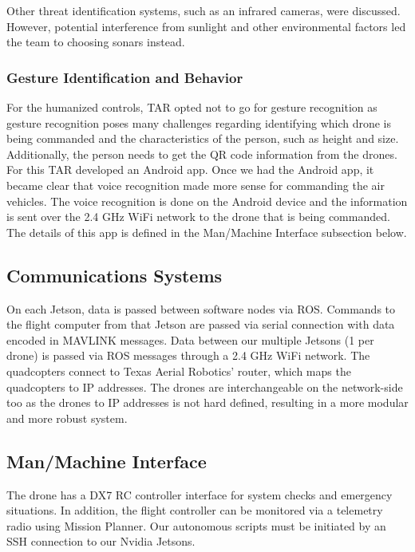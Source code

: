 \documentclass[12pt,letterpaper]{article}
\begin{document}
		Other threat identification systems, such as an infrared cameras, were discussed. However, potential interference from sunlight and other environmental factors led the team to choosing sonars instead.

		\subsubsection*{Gesture Identification and Behavior}
		For the humanized controls, TAR opted not to go for gesture recognition as gesture recognition poses many challenges regarding identifying which drone is being commanded and the characteristics of the person, such as height and size. Additionally, the person needs to get the QR code information from the drones. For this TAR developed an Android app. Once we had the Android app, it became clear that voice recognition made more sense for commanding the air vehicles. The voice recognition is done on the Android device and the information is sent over the 2.4 GHz WiFi network to the drone that is being commanded. The details of this app is defined in the Man/Machine Interface subsection below.

	\subsection*{Communications Systems}
	On each Jetson, data is passed between software nodes via ROS. Commands to the flight computer from that Jetson are passed via serial connection with data encoded in MAVLINK messages. Data between our multiple Jetsons (1 per drone) is passed via ROS messages through a 2.4 GHz WiFi network. The quadcopters connect to Texas Aerial Robotics’ router, which maps the quadcopters to IP addresses. The drones are interchangeable on the network-side too as the drones to IP addresses is not hard defined, resulting in a more modular and more robust system.

	\subsection*{Man/Machine Interface}
	The drone has a DX7 RC controller interface for system checks and emergency situations. In addition, the flight controller can be monitored via a telemetry radio using Mission Planner. Our autonomous scripts must be initiated by an SSH connection to our Nvidia Jetsons.
\end{document}
